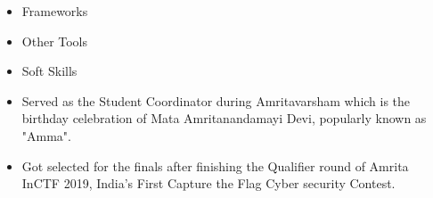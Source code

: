 \smallskip\smallskip

\begin{itemize}
    \item \textcolor{emphasis}{Frameworks} 
\end{itemize}

\smallskip\smallskip

\begin{itemize}
    \item \textcolor{emphasis}{Other Tools} 
\end{itemize}

\smallskip\smallskip

\begin{itemize}
    \item \textcolor{emphasis}{Soft Skills} 
\end{itemize}




\begin{itemize}
    \item Served as the Student Coordinator during Amritavarsham which is the birthday celebration of Mata Amritanandamayi Devi, popularly known as "Amma".
    \item Got selected for the finals after finishing the Qualifier round of Amrita InCTF 2019, India’s First Capture the Flag Cyber security Contest.
\end{itemize}

